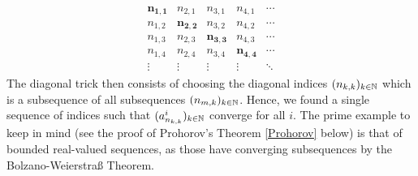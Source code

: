 \begin{align*}
	 \begin{array}{rrrrr}
		\mathbf{n_{1,1}} & n_{2,1} & n_{3,1}&n_{4,1}&\cdots\\ 
		n_{1,2} & \mathbf{n_{2,2}} & n_{3,2}&n_{4,2}&\cdots \\
		n_{1,3}  & n_{2,3}  & \mathbf{n_{3,3}}&n_{4,3}&\cdots\\ 
		n_{1,4}  & n_{2,4}&n_{3,4}  &\mathbf{n_{4,4}}&\cdots\\
		\vdots& \vdots &\vdots &\vdots &\ddots
		\end{array}
\end{align*}
The diagonal trick then consists of choosing the diagonal indices $(n_{k,k})_{k\in\mathbb{N}}$ which is a subsequence of all subsequences $(n_{m,k})_{k\in\mathbb{N}}$. Hence, we found a single sequence of indices such that $(a^i_{n_{k,k}})_{k\in\mathbb{N}}$ converge for all $i$. The prime example to keep in mind (see the proof of Prohorov's Theorem \ref{Prohorov} below) is that of bounded real-valued sequences, as those have converging subsequences by the Bolzano-Weierstra\ss{} Theorem. 


